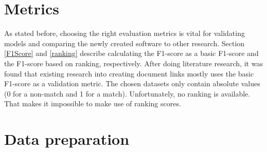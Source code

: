 \section{Metrics}
\label{secMetrics}
As stated before, choosing the right evaluation metrics is vital for validating models and comparing the newly created software to other research. Section \ref{F1Score} and \ref{ranking} describe calculating the F1-score as a basic F1-score and the F1-score based on ranking, respectively. After doing literature research, it was found that existing research into creating document links mostly uses the basic F1-score as a validation metric. The chosen datasets only contain absolute values (0 for a non-match and 1 for a match). Unfortunately, no ranking is available. That makes it impossible to make use of ranking scores.
\pagebreak


\section{Data preparation}
\label{secDataPreparation}

